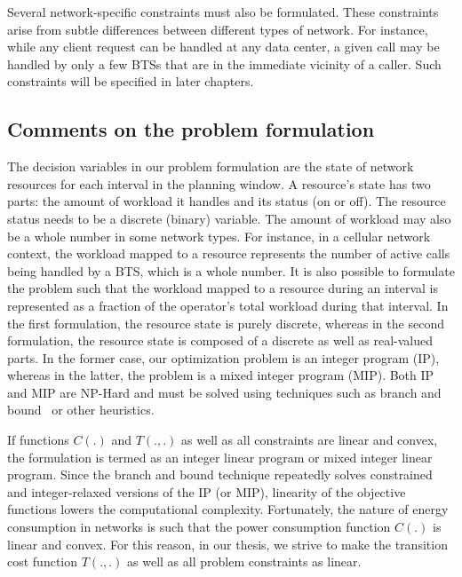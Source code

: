 Several network-specific constraints must also be formulated. These constraints arise from subtle differences between different types of network. For instance, while any client request can be handled at any data center, a given call may be handled by only a few BTSs that are in the immediate vicinity of a caller. Such constraints will be specified in later chapters.

\subsection{Comments on the problem formulation}
The decision variables in our problem formulation are the state of network resources for each interval in the planning window. A resource's state has two parts: the amount of workload it handles and its status (on or off). The resource status needs to be a discrete (binary) variable. The amount of workload may also be a whole number in some network types. For instance, in a cellular network context, the workload mapped to a resource represents the number of active calls being handled by a BTS, which is a whole number. It is also possible to formulate the problem such that the workload mapped to a resource during an interval is represented as a fraction of the operator's total workload during that interval. In the first formulation, the resource state is purely discrete, whereas in the second formulation, the resource state is composed of a discrete as well as real-valued parts. In the former case, our optimization problem is an integer program (IP), whereas in the latter, the problem is a mixed integer program (MIP). Both IP and MIP are NP-Hard and must be solved using techniques such as branch and bound~\cite{land60a} or other heuristics. 

If functions $C(.)$ and $T(.,.)$ as well as all constraints are linear and convex, the formulation is termed as an integer linear program or mixed integer linear program. Since the branch and bound technique repeatedly solves constrained and integer-relaxed versions of the IP (or MIP), linearity of the objective functions lowers the computational complexity. Fortunately, the nature of energy consumption in networks is such that the power consumption function $C(.)$ is linear and convex. For this reason, in our thesis, we strive to make the transition cost function $T(.,.)$ as well as all problem constraints as linear.

